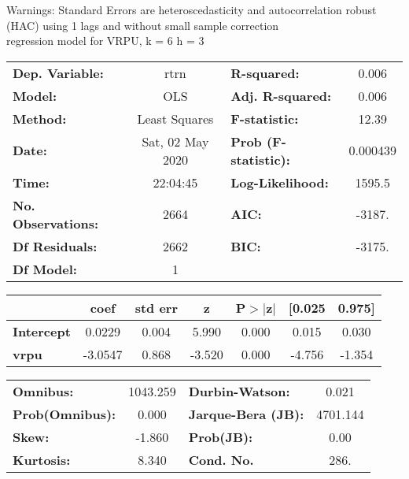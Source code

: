 Warnings: \newline
 [1] Standard Errors are heteroscedasticity and autocorrelation robust (HAC) using 1 lags and without small sample correction\\ 

regression model for VRPU, k = 6 h = 3\begin{center}
\begin{tabular}{lclc}
\toprule
\textbf{Dep. Variable:}    &       rtrn       & \textbf{  R-squared:         } &     0.006   \\
\textbf{Model:}            &       OLS        & \textbf{  Adj. R-squared:    } &     0.006   \\
\textbf{Method:}           &  Least Squares   & \textbf{  F-statistic:       } &     12.39   \\
\textbf{Date:}             & Sat, 02 May 2020 & \textbf{  Prob (F-statistic):} &  0.000439   \\
\textbf{Time:}             &     22:04:45     & \textbf{  Log-Likelihood:    } &    1595.5   \\
\textbf{No. Observations:} &        2664      & \textbf{  AIC:               } &    -3187.   \\
\textbf{Df Residuals:}     &        2662      & \textbf{  BIC:               } &    -3175.   \\
\textbf{Df Model:}         &           1      & \textbf{                     } &             \\
\bottomrule
\end{tabular}
\begin{tabular}{lcccccc}
                   & \textbf{coef} & \textbf{std err} & \textbf{z} & \textbf{P$> |$z$|$} & \textbf{[0.025} & \textbf{0.975]}  \\
\midrule
\textbf{Intercept} &       0.0229  &        0.004     &     5.990  &         0.000        &        0.015    &        0.030     \\
\textbf{vrpu}      &      -3.0547  &        0.868     &    -3.520  &         0.000        &       -4.756    &       -1.354     \\
\bottomrule
\end{tabular}
\begin{tabular}{lclc}
\textbf{Omnibus:}       & 1043.259 & \textbf{  Durbin-Watson:     } &    0.021  \\
\textbf{Prob(Omnibus):} &   0.000  & \textbf{  Jarque-Bera (JB):  } & 4701.144  \\
\textbf{Skew:}          &  -1.860  & \textbf{  Prob(JB):          } &     0.00  \\
\textbf{Kurtosis:}      &   8.340  & \textbf{  Cond. No.          } &     286.  \\
\bottomrule
\end{tabular}
\end{center}

